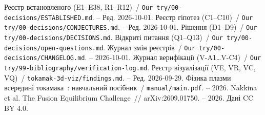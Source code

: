  Реєстр встановленого (E1--E38, R1--R12)~/ \texttt{Our try/00-decisions/ESTABLISHED.md}. -- Ред. 2026-10-01.
 Реєстр гіпотез (C1--C10)~/ \texttt{Our try/00-decisions/CONJECTURES.md}. -- Ред. 2026-10-01.
 Рішення (D1--D9)~/ \texttt{Our try/00-decisions/DECISIONS.md}.
 Відкриті питання (Q1--Q13)~/ \texttt{Our try/00-decisions/open-questions.md}.
 Журнал змін реєстрів~/ \texttt{Our try/00-decisions/CHANGELOG.md}. -- 2026-10-01.
 Журнал верифікації (V-A1…V-C4)~/ \texttt{Our try/99-bibliography/verification-log.md}.
 Реєстр візуалізації (VE, VR, VC, VQ)~/ \texttt{tokamak-3d-viz/findings.md}. -- Ред. 2026-09-29.
 Фізика плазми всередині токамака~: навчальний посібник~/ \texttt{manual/main.pdf}. -- 2026.
 Nakkina et al. The Fusion Equilibrium Challenge~// arXiv:2609.01750. -- 2026. Дані CC BY 4.0.
